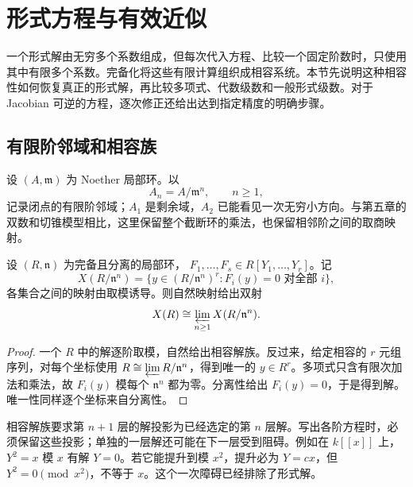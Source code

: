 
% 
% 
% 

\section{形式方程与有效近似}
\label{g5:sec:0705}

一个形式解由无穷多个系数组成，但每次代入方程、比较一个固定阶数时，只使用其中有限多个系数。完备化将这些有限计算组织成相容系统。本节先说明这种相容性如何恢复真正的形式解，再比较多项式、代数级数和一般形式级数。对于 Jacobian 可逆的方程，逐次修正还给出达到指定精度的明确步骤。

\subsection{有限阶邻域和相容族}
\label{g5:subsec:0705:01}

设 \((A,\mathfrak m)\) 为 Noether 局部环。以
\[
	A_n=A/\mathfrak m^n,\qquad n\geq1,
\]
记录闭点的有限阶邻域；\(A_1\) 是剩余域，\(A_2\) 已能看见一次无穷小方向。与第五章的双数和切锥模型相比，这里保留整个截断环的乘法，也保留相邻阶之间的取商映射。

\begin{proposition}\label{g5:prop:formal-solutions-inverse-limit}
	设 \((R,\mathfrak n)\) 为完备且分离的局部环，
	\(F_1,\ldots,F_s\in R[Y_1,\ldots,Y_r]\)。记
	\[
		X(R/\mathfrak n^n)
		=\{y\in(R/\mathfrak n^n)^r:F_i(y)=0\text{ 对全部 }i\},
	\]
	各集合之间的映射由取模诱导。则自然映射给出双射
	\[
		X(R)\cong\varprojlim_{n\geq1}X(R/\mathfrak n^n).
	\]
\end{proposition}
\begin{proof}
	一个 \(R\) 中的解逐阶取模，自然给出相容解族。反过来，给定相容的 \(r\) 元组序列，对每个坐标使用 \(R\cong\varprojlim R/\mathfrak n^n\)，得到唯一的 \(y\in R^r\)。多项式只含有限次加法和乘法，故 \(F_i(y)\) 模每个 \(\mathfrak n^n\) 都为零。分离性给出 \(F_i(y)=0\)，于是得到解。唯一性同样逐个坐标来自分离性。
\end{proof}

相容解族要求第 \(n+1\) 层的解投影为已经选定的第 \(n\) 层解。写出各阶方程时，必须保留这些投影；单独的一层解还可能在下一层受到阻碍。例如在 \(k[[x]]\) 上，\(Y^2=x\) 模 \(x\) 有解 \(Y=0\)。若它能提升到模 \(x^2\)，提升必为 \(Y=cx\)，但 \(Y^2=0\pmod{x^2}\)，不等于 \(x\)。这个一次障碍已经排除了形式解。

